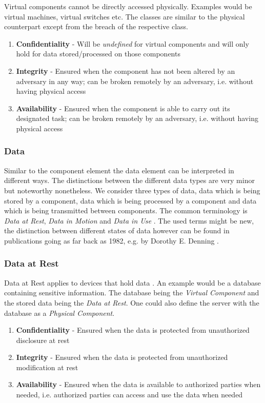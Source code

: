 Virtual components cannot be directly accessed physically. Examples would be virtual machines, virtual switches etc. The classes are similar to the physical counterpart except from the breach of the respective class.

\begin{enumerate}
\item \textbf{Confidentiality} - Will be \textit{undefined} for virtual components and will only hold for data stored/processed on those components
\item \textbf{Integrity} - Ensured when the component has not been altered by an adversary in any way; can be broken remotely by an adversary, i.e. without having physical access
\item \textbf{Availability} - Ensured when the component is able to carry out its designated task; can be broken remotely by an adversary, i.e. without having physical access
\end{enumerate}

\subsubsection{Data}

Similar to the component element the data element can be interpreted in different ways.
The distinctions between the different data types are very minor but noteworthy nonetheless. We consider three types of data, data which is being stored by a component, data which is being processed by a component and data which is being transmitted between components. The common terminology is \textit{Data at Rest}, \textit{Data in Motion} and \textit{Data in Use} \cite{kanagasingham2008data}. The used terms might be new, the distinction between different states of data however can be found in publications going as far back as 1982, e.g. by Dorothy E. Denning \cite{robling1982cryptography}.

\subsubsection*{Data at Rest}

Data at Rest applies to devices that hold data \cite{kanagasingham2008data}. An example would be a database containing sensitive information. The database being the \textit{Virtual Component} and the stored data being the \textit{Data at Rest}. One could also define the server with the database as a \textit{Physical Component}.

\begin{enumerate}
\item \textbf{Confidentiality} - Ensured when the data is protected from unauthorized disclosure at rest
\item \textbf{Integrity} - Ensured when the data is protected from unauthorized modification at rest
\item \textbf{Availability} - Ensured when the data is available to authorized parties when needed, i.e. authorized parties can access and use the data when needed
\end{enumerate}

